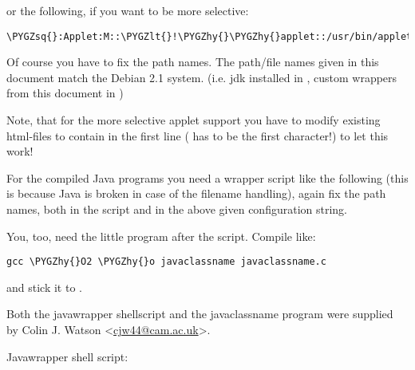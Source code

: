\documentclass[a4paper,8pt,english]{sphinxmanual}
\def\PYGZlt{\char`\<}
\def\PYGZhy{\char`\-}
\def\PYGZsq{\char`\'}
\renewcommand\PYGZsq{\textquotesingle}
\begin{document}
\begin{enumerate}
or the following, if you want to be more selective:

\begin{Verbatim}[commandchars=\\\{\}]
\PYGZsq{}:Applet:M::\PYGZlt{}!\PYGZhy{}\PYGZhy{}applet::/usr/bin/appletviewer:\PYGZsq{}
\end{Verbatim}

Of course you have to fix the path names. The path/file names given in this
document match the Debian 2.1 system. (i.e. jdk installed in ,
custom wrappers from this document in )

Note, that for the more selective applet support you have to modify
existing html-files to contain  in the first line
(\code{\textless{}} has to be the first character!) to let this work!

For the compiled Java programs you need a wrapper script like the
following (this is because Java is broken in case of the filename
handling), again fix the path names, both in the script and in the
above given configuration string.

You, too, need the little program after the script. Compile like:

\begin{Verbatim}[commandchars=\\\{\}]
gcc \PYGZhy{}O2 \PYGZhy{}o javaclassname javaclassname.c
\end{Verbatim}

and stick it to .

Both the javawrapper shellscript and the javaclassname program
were supplied by Colin J. Watson \textless{}\href{mailto:cjw44@cam.ac.uk}{cjw44@cam.ac.uk}\textgreater{}.

\end{enumerate}

Javawrapper shell script:
\end{document}
